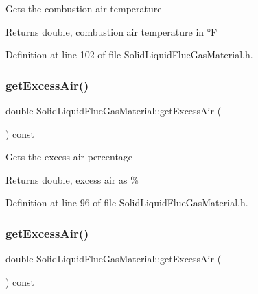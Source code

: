 Gets the combustion air temperature \begin{DoxyReturn}{Returns}
double, combustion air temperature in °F 
\end{DoxyReturn}


Definition at line 102 of file Solid\+Liquid\+Flue\+Gas\+Material.\+h.

\mbox{\label{class_solid_liquid_flue_gas_material_a49e7bb4ebc45897c81b6f38610ceaf02}} 
\subsubsection{\texorpdfstring{get\+Excess\+Air()}{getExcessAir()}\hspace{0.1cm}{\footnotesize\ttfamily [1/3]}}
{\footnotesize\ttfamily double Solid\+Liquid\+Flue\+Gas\+Material\+::get\+Excess\+Air (\begin{DoxyParamCaption}{ }\end{DoxyParamCaption}) const\hspace{0.3cm}{\ttfamily [inline]}}

Gets the excess air percentage \begin{DoxyReturn}{Returns}
double, excess air as \% 
\end{DoxyReturn}


Definition at line 96 of file Solid\+Liquid\+Flue\+Gas\+Material.\+h.

\mbox{\label{class_solid_liquid_flue_gas_material_a49e7bb4ebc45897c81b6f38610ceaf02}} 
\subsubsection{\texorpdfstring{get\+Excess\+Air()}{getExcessAir()}\hspace{0.1cm}{\footnotesize\ttfamily [2/3]}}
{\footnotesize\ttfamily double Solid\+Liquid\+Flue\+Gas\+Material\+::get\+Excess\+Air (\begin{DoxyParamCaption}{ }\end{DoxyParamCaption}) const\hspace{0.3cm}{\ttfamily [inline]}}

